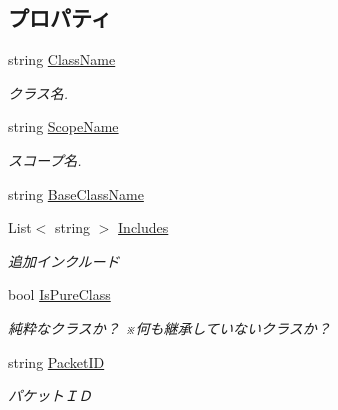 \subsection*{プロパティ}
\begin{DoxyCompactItemize}
\item 
string \mbox{\hyperlink{classNativePacketGenerator_1_1ClassData_ae0f105d4f47837085a3bc4f90e2f4404}{Class\+Name}}
\begin{DoxyCompactList}\small\item\em クラス名. \end{DoxyCompactList}\item 
string \mbox{\hyperlink{classNativePacketGenerator_1_1ClassData_a6a15b97586de5d3f69b48a1f556b460d}{Scope\+Name}}
\begin{DoxyCompactList}\small\item\em スコープ名. \end{DoxyCompactList}\item 
string \mbox{\hyperlink{classNativePacketGenerator_1_1ClassData_a725ec9075101d1744d21c69ca41bcd27}{Base\+Class\+Name}}
\item 
List$<$ string $>$ \mbox{\hyperlink{classNativePacketGenerator_1_1ClassData_a2ca4c4ba5da802ed6a736efae338180a}{Includes}}
\begin{DoxyCompactList}\small\item\em 追加インクルード \end{DoxyCompactList}\item 
bool \mbox{\hyperlink{classNativePacketGenerator_1_1ClassData_a413aaadc4e8ec360bf9902159bb1f456}{Is\+Pure\+Class}}
\begin{DoxyCompactList}\small\item\em 純粋なクラスか？ ※何も継承していないクラスか？ \end{DoxyCompactList}\item 
string \mbox{\hyperlink{classNativePacketGenerator_1_1ClassData_af6f1e3ce3d6acf846175754aeeac7897}{Packet\+ID}}
\begin{DoxyCompactList}\small\item\em パケットＩＤ \end{DoxyCompactList}\item 

\end{DoxyCompactItemize}

